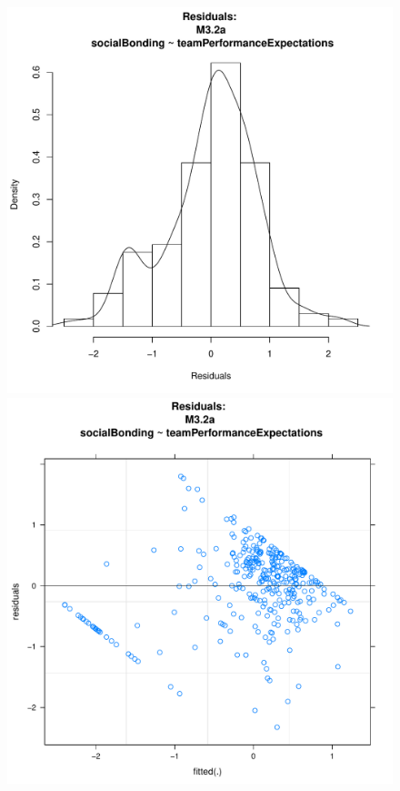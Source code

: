 \documentclass[12pt]{report}
\begin{document}
{\begin{figure}[htbp]
  \includegraphics[scale =.4]{../images/MLM32aHist.pdf}
  \includegraphics[scale =.4]{../images/MLM32aScatter.pdf}

\end{figure}}
\end{document}
